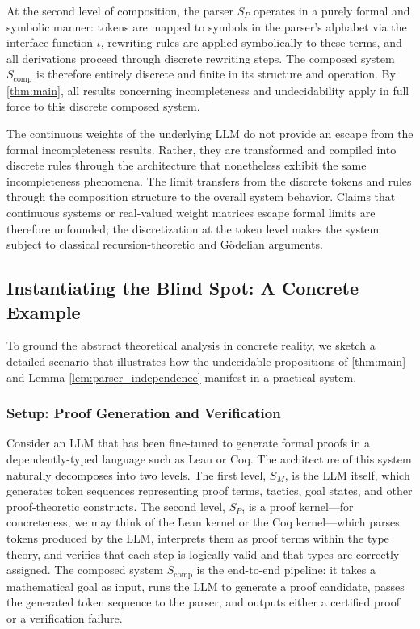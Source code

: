 \documentclass[11pt]{article}
\begin{document}
At the second level of composition, the parser $S_P$ operates in a purely formal and symbolic manner: tokens are mapped to symbols in the parser's alphabet via the interface function $\iota$, rewriting rules are applied symbolically to these terms, and all derivations proceed through discrete rewriting steps. The composed system $S_{\text{comp}}$ is therefore entirely discrete and finite in its structure and operation. By \ref{thm:main}, all results concerning incompleteness and undecidability apply in full force to this discrete composed system.

The continuous weights of the underlying LLM do not provide an escape from the formal incompleteness results. Rather, they are transformed and compiled into discrete rules through the architecture that nonetheless exhibit the same incompleteness phenomena. The limit transfers from the discrete tokens and rules through the composition structure to the overall system behavior. Claims that continuous systems or real-valued weight matrices escape formal limits are therefore unfounded; the discretization at the token level makes the system subject to classical recursion-theoretic and Gödelian arguments.

\subsection{Instantiating the Blind Spot: A Concrete Example}
\label{subsec:concrete_example}

To ground the abstract theoretical analysis in concrete reality, we sketch a detailed scenario that illustrates how the undecidable propositions of \ref{thm:main} and Lemma \ref{lem:parser_independence} manifest in a practical system.

\subsubsection{Setup: Proof Generation and Verification}

Consider an LLM that has been fine-tuned to generate formal proofs in a dependently-typed language such as Lean or Coq. The architecture of this system naturally decomposes into two levels. The first level, $S_M$, is the LLM itself, which generates token sequences representing proof terms, tactics, goal states, and other proof-theoretic constructs. The second level, $S_P$, is a proof kernel—for concreteness, we may think of the Lean kernel or the Coq kernel—which parses tokens produced by the LLM, interprets them as proof terms within the type theory, and verifies that each step is logically valid and that types are correctly assigned. The composed system $S_{\text{comp}}$ is the end-to-end pipeline: it takes a mathematical goal as input, runs the LLM to generate a proof candidate, passes the generated token sequence to the parser, and outputs either a certified proof or a verification failure.
\end{document}
